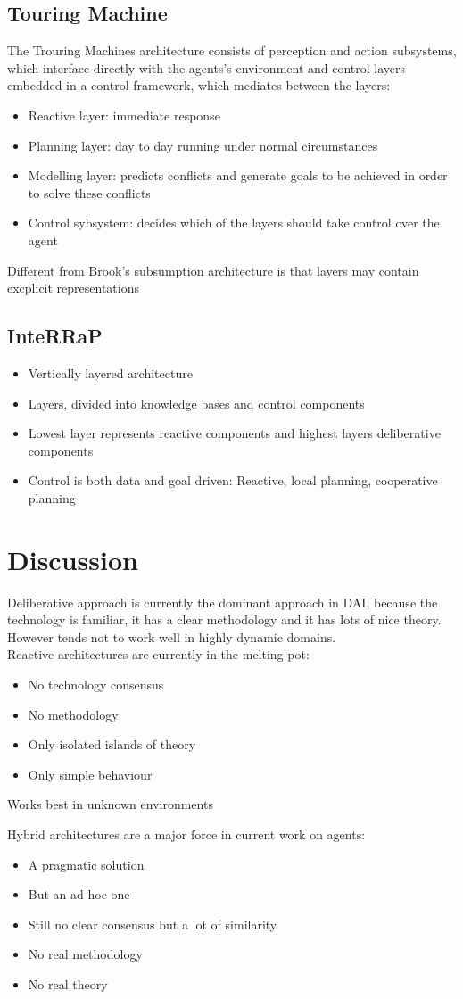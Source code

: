 \subsection{Touring Machine}
The Trouring Machines architecture consists of perception and action subsystems, which interface directly with the agents's environment and control layers embedded in a control framework, which mediates between the layers:
\begin{itemize}
\item Reactive layer: immediate response
\item Planning layer: day to day running under normal circumstances
\item Modelling layer: predicts conflicts and generate goals to be achieved in order to solve these conflicts
\item Control sybsystem: decides which of the layers should take control over the agent
\end{itemize}
Different from Brook's subsumption architecture is that layers may contain excplicit representations 
\subsection{InteRRaP}
\begin{itemize}
\item Vertically layered architecture
\item Layers, divided into knowledge bases and control components
\item Lowest layer represents reactive components and highest layers deliberative components
\item Control is both data and goal driven: Reactive, local planning, cooperative planning
\end{itemize}
\section{Discussion}
Deliberative approach is currently the dominant approach in DAI, because the technology is familiar, it has a clear methodology and it has lots of nice theory.
However tends not to work well in highly dynamic domains.\\

Reactive architectures are currently in the melting pot:
\begin{itemize}
\item No technology consensus
\item No methodology
\item Only isolated islands of theory
\item Only simple behaviour
\end{itemize}
Works best in unknown environments

Hybrid architectures are a major force in current work on agents:
\begin{itemize}
\item A pragmatic solution
\item But an ad hoc one
\item Still no clear consensus but a lot of similarity
\item No real methodology
\item No real theory
\end{itemize}